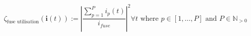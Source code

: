 \begin{equation}
	\zeta_\text{fuse utilisation}(\textbf{i}(t)) :=%
	\left|\frac{\sum_{p=1}^{P}{i_p(t)}}{i_{fuse}}\right|^2 \forall t%
	\text{ where } p \in [1, \dots, P]%
	\text{ and } P \in \mathbb{N}_{>0}
	\label{ch1:equ:fuse-utilisation}
\end{equation}